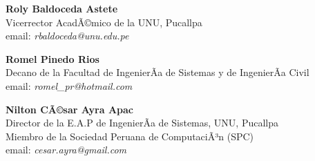 \begin{center}
\textbf{Roly Baldoceda Astete}\\
Vicerrector AcadÃ©mico de la UNU, Pucallpa\\
email: \textit{rbaldoceda@unu.edu.pe}\\
\end{center}

\begin{center}
\textbf{Romel Pinedo Rios}\\
Decano de la Facultad de IngenierÃ­a de Sistemas y de IngenierÃ­a Civil\\
email: \textit{romel\_pr@hotmail.com}\\
\end{center}

\begin{center}
\textbf{Nilton CÃ©sar Ayra Apac}\\
Director de la E.A.P de IngenierÃ­a de Sistemas, UNU, Pucallpa\\
Miembro de la Sociedad Peruana de ComputaciÃ³n (SPC)\\
email: \textit{cesar.ayra@gmail.com}\\
\end{center}

\newpage

